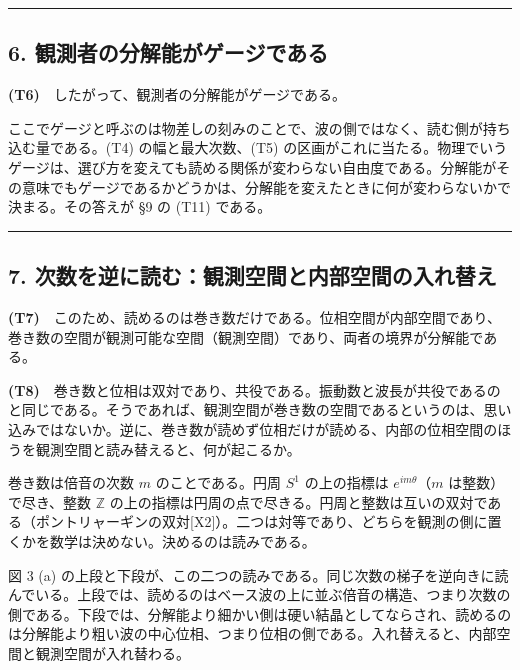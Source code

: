 \documentclass[
  a4paper,
]{ltjsarticle}
\begin{document}
\begin{center}\rule{0.5\linewidth}{0.5pt}\end{center}

\subsection{6.
観測者の分解能がゲージである}\label{ux89b3ux6e2cux8005ux306eux5206ux89e3ux80fdux304cux30b2ux30fcux30b8ux3067ux3042ux308b}

\textbf{(T6)}　したがって、観測者の分解能がゲージである。

ここでゲージと呼ぶのは物差しの刻みのことで、波の側ではなく、読む側が持ち込む量である。(T4)
の幅と最大次数、(T5)
の区画がこれに当たる。物理でいうゲージは、選び方を変えても読める関係が変わらない自由度である。分解能がその意味でもゲージであるかどうかは、分解能を変えたときに何が変わらないかで決まる。その答えが
§9 の (T11) である。

\begin{center}\rule{0.5\linewidth}{0.5pt}\end{center}

\subsection{7.
次数を逆に読む：観測空間と内部空間の入れ替え}\label{ux6b21ux6570ux3092ux9006ux306bux8aadux3080ux89b3ux6e2cux7a7aux9593ux3068ux5185ux90e8ux7a7aux9593ux306eux5165ux308cux66ffux3048}

\textbf{(T7)}　このため、読めるのは巻き数だけである。位相空間が内部空間であり、巻き数の空間が観測可能な空間（観測空間）であり、両者の境界が分解能である。

\textbf{(T8)}　巻き数と位相は双対であり、共役である。振動数と波長が共役であるのと同じである。そうであれば、観測空間が巻き数の空間であるというのは、思い込みではないか。逆に、巻き数が読めず位相だけが読める、内部の位相空間のほうを観測空間と読み替えると、何が起こるか。

巻き数は倍音の次数 \(m\) のことである。円周 \(S^1\) の上の指標は
\(e^{im\theta}\)（\(m\) は整数）で尽き、整数 \(\mathbb{Z}\)
の上の指標は円周の点で尽きる。円周と整数は互いの双対である（ポントリャーギンの双対{[}X2{]}）。二つは対等であり、どちらを観測の側に置くかを数学は決めない。決めるのは読みである。

図 3 (a)
の上段と下段が、この二つの読みである。同じ次数の梯子を逆向きに読んでいる。上段では、読めるのはベース波の上に並ぶ倍音の構造、つまり次数の側である。下段では、分解能より細かい側は硬い結晶としてならされ、読めるのは分解能より粗い波の中心位相、つまり位相の側である。入れ替えると、内部空間と観測空間が入れ替わる。
\end{document}
